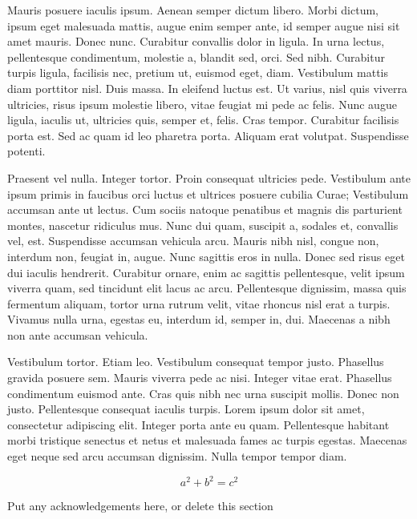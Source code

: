 Mauris posuere iaculis ipsum. Aenean semper dictum libero. Morbi dictum, ipsum eget malesuada mattis, augue enim semper ante, id semper augue nisi sit amet mauris. Donec nunc. Curabitur convallis dolor in ligula. In urna lectus, pellentesque condimentum, molestie a, blandit sed, orci. Sed nibh. Curabitur turpis ligula, facilisis nec, pretium ut, euismod eget, diam. Vestibulum mattis diam porttitor nisl. Duis massa. In eleifend luctus est. Ut varius, nisl quis viverra ultricies, risus ipsum molestie libero, vitae feugiat mi pede ac felis. Nunc augue ligula, iaculis ut, ultricies quis, semper et, felis. Cras tempor. Curabitur facilisis porta est. Sed ac quam id leo pharetra porta. Aliquam erat volutpat. Suspendisse potenti.

Praesent vel nulla. Integer tortor. Proin consequat ultricies pede. Vestibulum ante ipsum primis in faucibus orci luctus et ultrices posuere cubilia Curae; Vestibulum accumsan ante ut lectus. Cum sociis natoque penatibus et magnis dis parturient montes, nascetur ridiculus mus. Nunc dui quam, suscipit a, sodales et, convallis vel, est. Suspendisse accumsan vehicula arcu. Mauris nibh nisl, congue non, interdum non, feugiat in, augue. Nunc sagittis eros in nulla. Donec sed risus eget dui iaculis hendrerit. Curabitur ornare, enim ac sagittis pellentesque, velit ipsum viverra quam, sed tincidunt elit lacus ac arcu. Pellentesque dignissim, massa quis fermentum aliquam, tortor urna rutrum velit, vitae rhoncus nisl erat a turpis. Vivamus nulla urna, egestas eu, interdum id, semper in, dui. Maecenas a nibh non ante accumsan vehicula.

Vestibulum tortor. Etiam leo. Vestibulum consequat tempor justo. Phasellus gravida posuere sem. Mauris viverra pede ac nisi. Integer vitae erat. Phasellus condimentum euismod ante. Cras quis nibh nec urna suscipit mollis. Donec non justo. Pellentesque consequat iaculis turpis. Lorem ipsum dolor sit amet, consectetur adipiscing elit. Integer porta ante eu quam. Pellentesque habitant morbi tristique senectus et netus et malesuada fames ac turpis egestas. Maecenas eget neque sed arcu accumsan dignissim. Nulla tempor tempor diam.

\begin{equation}
a^2+b^2=c^2
\end{equation}


\begin{acknowledgements}
Put any acknowledgements here, or delete this section
\end{acknowledgements}

